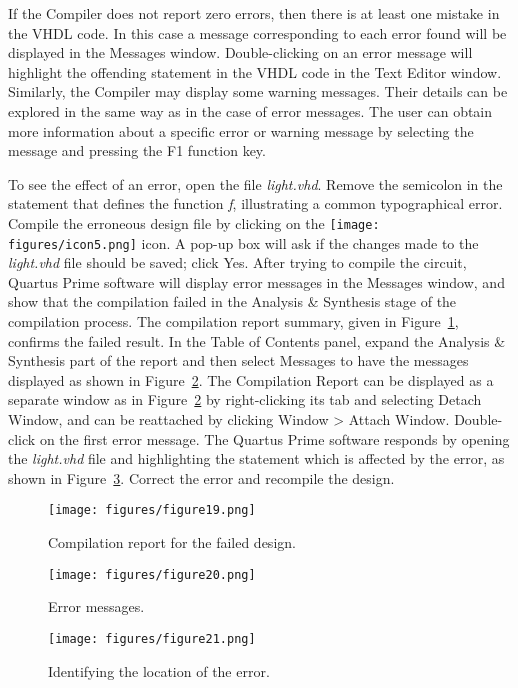 If the Compiler does not report zero errors, then there is at least one mistake 
in the VHDL code. In this case a message corresponding to each error found will
be displayed in the Messages window.  Double-clicking on an error message will highlight 
the offending statement in the VHDL code in the Text Editor window. 
Similarly, the Compiler may display some warning messages. Their details can be
explored in the same way as in the case of error messages.
The user can obtain more information about a specific error or warning message
by selecting the message and pressing the {\sf F1} function key.

To see the effect of an error, open the file {\it light.vhd}.  Remove the semicolon in the 
statement that defines the function {\it f}, illustrating a common typographical error.
Compile the erroneous design file by clicking on the 
\texttt{[image: figures/icon5.png]} icon.
A pop-up box will ask if the changes made to the {\it light.vhd} file should be saved;
click {\sf Yes}. After trying to compile the circuit,
Quartus Prime software will display error messages in the Messages window, and 
show that the compilation failed in the {\sf Analysis \& Synthesis} stage of the compilation process.
The compilation report summary, given in Figure~\ref{fig:19}, 
confirms the failed result. In the Table of Contents panel, expand the 
{\sf Analysis \& Synthesis} part of the report
and then select {\sf Messages} to have the messages displayed as shown in Figure~\ref{fig:20}.
The Compilation Report can be displayed as a separate window as in Figure~\ref{fig:20} 
by right-clicking its tab and selecting {\sf Detach Window}, and can be reattached by clicking
{\sf Window > Attach Window}. Double-click on the first error message. 
The Quartus Prime software responds by opening the {\it light.vhd}
file and highlighting the statement which is affected by the error,
as shown in Figure~\ref{fig:21}.
Correct the error and recompile the design.

\begin{figure}[H]
   \begin{center}
      \texttt{[image: figures/figure19.png]}
   \caption{Compilation report for the failed design.} 
	 \label{fig:19}
	 \end{center}
\end{figure}

\begin{figure}[H]
   \begin{center}
      \texttt{[image: figures/figure20.png]}
   \caption{Error messages.}
	 \label{fig:20}
	 \end{center}
\end{figure}

\begin{figure}[H]
   \begin{center}
      \texttt{[image: figures/figure21.png]}
   \caption{Identifying the location of the error.} 
	 \label{fig:21}
	 \end{center}
\end{figure}
